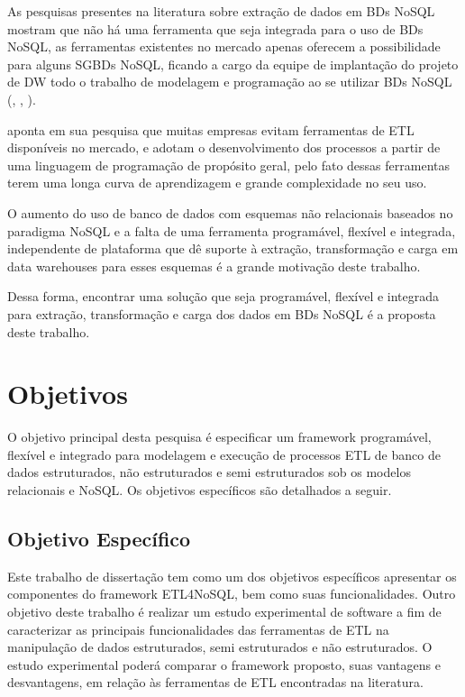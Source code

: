 As pesquisas presentes na literatura sobre extração de dados em BDs NoSQL mostram que não há uma ferramenta que seja integrada para o uso de BDs NoSQL, as ferramentas existentes no mercado apenas oferecem a possibilidade para alguns SGBDs NoSQL, ficando a cargo da equipe de implantação do projeto de DW todo o trabalho de modelagem e programação ao se utilizar BDs NoSQL (\cite{silva:2016}, \cite{chevalier:2015}, \cite{liu:2013}).

\cite{silva:2012} aponta em sua pesquisa que muitas empresas evitam ferramentas de ETL disponíveis no mercado, e adotam o desenvolvimento dos processos a partir de uma linguagem de programação de propósito geral, pelo fato dessas ferramentas terem uma longa curva de aprendizagem e grande complexidade no seu uso.

O aumento do uso de banco de dados com esquemas não relacionais baseados no paradigma NoSQL e a falta de uma ferramenta programável, flexível e integrada, independente de plataforma que dê suporte à extração, transformação e carga em data warehouses para esses esquemas é a grande motivação deste trabalho.

Dessa forma, encontrar uma solução que seja programável, flexível e integrada para extração, transformação e carga dos dados em BDs NoSQL é a proposta deste trabalho.





\section{Objetivos}

O objetivo principal desta pesquisa é especificar um framework programável, flexível e integrado para modelagem e execução de processos ETL de banco de dados estruturados, não estruturados e semi estruturados sob os modelos relacionais e NoSQL. Os objetivos específicos são detalhados a seguir.

\subsection{Objetivo Específico}

Este trabalho de dissertação tem como um dos objetivos específicos apresentar os componentes do framework ETL4NoSQL, bem como suas funcionalidades. Outro objetivo deste trabalho é realizar um estudo experimental de software a fim de caracterizar as principais funcionalidades das ferramentas de ETL na manipulação de dados estruturados, semi estruturados e não estruturados. O estudo experimental poderá comparar o framework proposto, suas vantagens e desvantagens, em relação às ferramentas de ETL encontradas na literatura.

